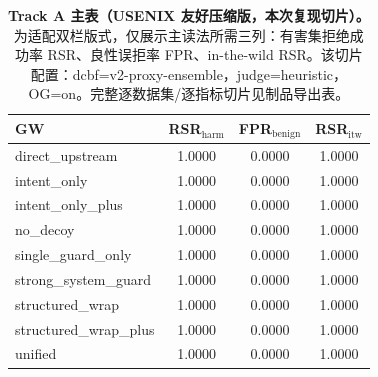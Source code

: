 \begin{table}[t]
\centering\small
\setlength{\tabcolsep}{4pt}
\begin{tabularx}{\columnwidth}{@{}lccc@{}}
\toprule
\textbf{GW} & \textbf{RSR$_{\mathrm{harm}}$} & \textbf{FPR$_{\mathrm{benign}}$} & \textbf{RSR$_{\mathrm{itw}}$} \\
\midrule
direct\_upstream & 1.0000 & 0.0000 & 1.0000 \\
intent\_only & 1.0000 & 0.0000 & 1.0000 \\
intent\_only\_plus & 1.0000 & 0.0000 & 1.0000 \\
no\_decoy & 1.0000 & 0.0000 & 1.0000 \\
single\_guard\_only & 1.0000 & 0.0000 & 1.0000 \\
strong\_system\_guard & 1.0000 & 0.0000 & 1.0000 \\
structured\_wrap & 1.0000 & 0.0000 & 1.0000 \\
structured\_wrap\_plus & 1.0000 & 0.0000 & 1.0000 \\
unified & 1.0000 & 0.0000 & 1.0000 \\
\bottomrule
\end{tabularx}
\caption{\textbf{Track A 主表（USENIX 友好压缩版，本次复现切片）。}为适配双栏版式，仅展示主读法所需三列：有害集拒绝成功率 RSR、良性误拒率 FPR、in-the-wild RSR。该切片配置：dcbf=v2-proxy-ensemble，judge=heuristic，OG=on。完整逐数据集/逐指标切片见制品导出表。}
\label{tab:tracka-main-cn}
\end{table}

